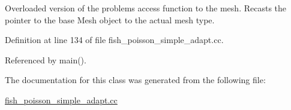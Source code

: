Overloaded version of the problem\textquotesingle{}s access function to the mesh. Recasts the pointer to the base Mesh object to the actual mesh type. 



Definition at line 134 of file fish\+\_\+poisson\+\_\+simple\+\_\+adapt.\+cc.



Referenced by main().



The documentation for this class was generated from the following file\+:\begin{DoxyCompactItemize}
\item 
\hyperlink{fish__poisson__simple__adapt_8cc}{fish\+\_\+poisson\+\_\+simple\+\_\+adapt.\+cc}\end{DoxyCompactItemize}
